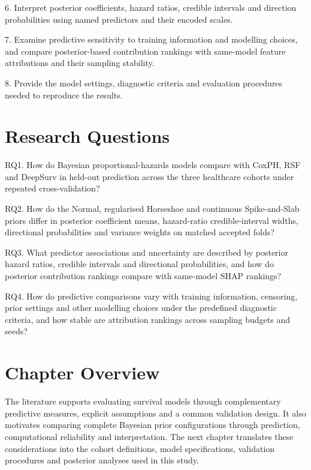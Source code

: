 6. Interpret posterior coefficients, hazard ratios, credible intervals and direction probabilities using named predictors and their encoded scales.

7. Examine predictive sensitivity to training information and modelling choices, and compare posterior-based contribution rankings with same-model feature attributions and their sampling stability.

8. Provide the model settings, diagnostic criteria and evaluation procedures needed to reproduce the results.

\section{Research Questions}\label{research-questions}

RQ1. How do Bayesian proportional-hazards models compare with CoxPH, RSF and DeepSurv in held-out prediction across the three healthcare cohorts under repeated cross-validation?

RQ2. How do the Normal, regularised Horseshoe and continuous Spike-and-Slab priors differ in posterior coefficient means, hazard-ratio credible-interval widths, directional probabilities and variance weights on matched accepted folds?

RQ3. What predictor associations and uncertainty are described by posterior hazard ratios, credible intervals and directional probabilities, and how do posterior contribution rankings compare with same-model SHAP rankings?

RQ4. How do predictive comparisons vary with training information, censoring, prior settings and other modelling choices under the predefined diagnostic criteria, and how stable are attribution rankings across sampling budgets and seeds?

\section{Chapter Overview}\label{chapter-overview}

The literature supports evaluating survival models through complementary predictive measures, explicit assumptions and a common validation design. It also motivates comparing complete Bayesian prior configurations through prediction, computational reliability and interpretation. The next chapter translates these considerations into the cohort definitions, model specifications, validation procedures and posterior analyses used in this study.
